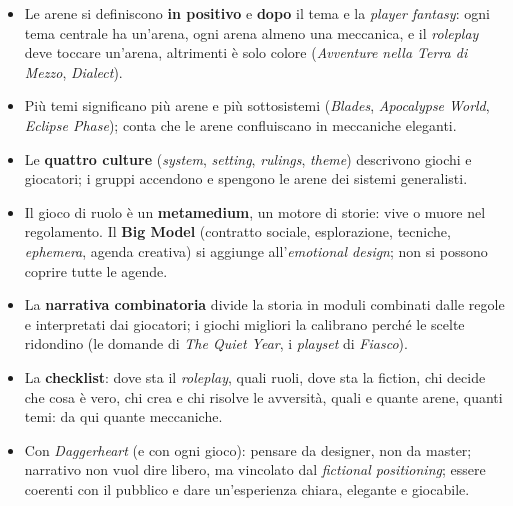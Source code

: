 \begin{itemize}
{        Blackbird}, dettagliatissima in GURPS).
  \item Le arene si definiscono \textbf{in positivo} e \textbf{dopo} il tema e la \emph{player
        fantasy}: ogni tema centrale ha un'arena, ogni arena almeno una meccanica, e il \emph{roleplay}
        deve toccare un'arena, altrimenti è solo colore (\emph{Avventure nella Terra di Mezzo},
        \emph{Dialect}).
  \item Più temi significano più arene e più sottosistemi (\emph{Blades}, \emph{Apocalypse World},
        \emph{Eclipse Phase}); conta che le arene confluiscano in meccaniche eleganti.
  \item Le \textbf{quattro culture} (\emph{system}, \emph{setting}, \emph{rulings}, \emph{theme})
        descrivono giochi e giocatori; i gruppi accendono e spengono le arene dei sistemi
        generalisti.
  \item Il gioco di ruolo è un \textbf{metamedium}, un motore di storie: vive o muore nel regolamento.
        Il \textbf{Big Model} (contratto sociale, esplorazione, tecniche, \emph{ephemera}, agenda
        creativa) si aggiunge all'\emph{emotional design}; non si possono coprire tutte le agende.
  \item La \textbf{narrativa combinatoria} divide la storia in moduli combinati dalle regole e
        interpretati dai giocatori; i giochi migliori la calibrano perché le scelte ridondino (le
        domande di \emph{The Quiet Year}, i \emph{playset} di \emph{Fiasco}).
  \item La \textbf{checklist}: dove sta il \emph{roleplay}, quali ruoli, dove sta la fiction, chi decide
        che cosa è vero, chi crea e chi risolve le avversità, quali e quante arene, quanti temi: da qui
        quante meccaniche.
  \item Con \emph{Daggerheart} (e con ogni gioco): pensare da designer, non da master; narrativo non
        vuol dire libero, ma vincolato dal \emph{fictional positioning}; essere coerenti con il
        pubblico e dare un'esperienza chiara, elegante e giocabile.
\end{itemize}
